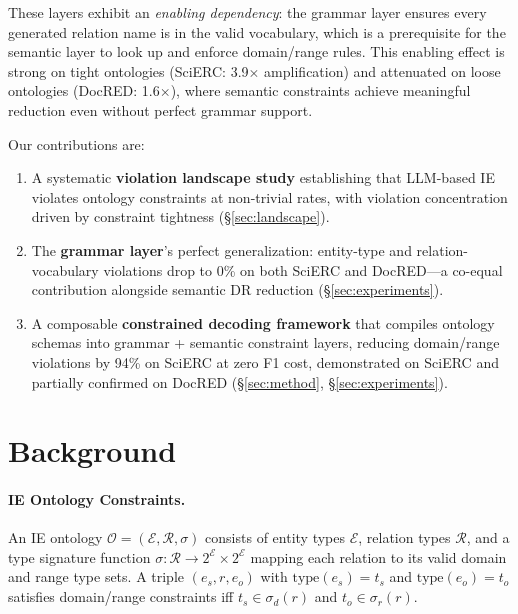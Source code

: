 \documentclass[11pt,a4paper]{article}
\begin{document}
These layers exhibit an \emph{enabling dependency}: the grammar layer ensures every generated relation name is in the valid vocabulary, which is a prerequisite for the semantic layer to look up and enforce domain/range rules.
This enabling effect is strong on tight ontologies (SciERC: 3.9$\times$ amplification) and attenuated on loose ontologies (DocRED: 1.6$\times$), where semantic constraints achieve meaningful reduction even without perfect grammar support.

Our contributions are:
\begin{enumerate}[leftmargin=*,nosep]
\item A systematic \textbf{violation landscape study} establishing that LLM-based IE violates ontology constraints at non-trivial rates, with violation concentration driven by constraint tightness (\S\ref{sec:landscape}).
\item The \textbf{grammar layer}'s perfect generalization: entity-type and relation-vocabulary violations drop to 0\% on both SciERC and DocRED---a co-equal contribution alongside semantic DR reduction (\S\ref{sec:experiments}).
\item A composable \textbf{constrained decoding framework} that compiles ontology schemas into grammar + semantic constraint layers, reducing domain/range violations by 94\% on SciERC at zero F1 cost, demonstrated on SciERC and partially confirmed on DocRED (\S\ref{sec:method}, \S\ref{sec:experiments}).
\end{enumerate}

\section{Background}

\paragraph{IE Ontology Constraints.}
An IE ontology $\mathcal{O} = (\mathcal{E}, \mathcal{R}, \sigma)$ consists of entity types $\mathcal{E}$, relation types $\mathcal{R}$, and a type signature function $\sigma: \mathcal{R} \to 2^{\mathcal{E}} \times 2^{\mathcal{E}}$ mapping each relation to its valid domain and range type sets.
A triple $(e_s, r, e_o)$ with $\text{type}(e_s) = t_s$ and $\text{type}(e_o) = t_o$ satisfies domain/range constraints iff $t_s \in \sigma_d(r)$ and $t_o \in \sigma_r(r)$.
\end{document}
